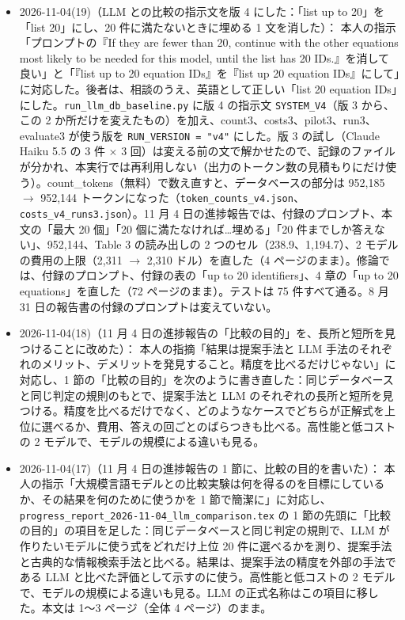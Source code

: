 \documentclass[11pt,a4paper]{jsarticle}
\begin{document}
\begin{itemize}[nosep]
  \item 2026-11-04(19)（LLM との比較の指示文を版 4 にした：「list up to 20」を「list 20」にし、20 件に満たないときに埋める 1 文を消した）：
    本人の指示「プロンプトの『If they are fewer than 20, continue with the other equations most likely to be needed for this model, until the list has 20 IDs.』を消して良い」と「『list up to 20 equation IDs』を『list up 20 equation IDs』にして」に対応した。後者は、相談のうえ、英語として正しい「list 20 equation IDs」にした。\texttt{run\_llm\_db\_baseline.py} に版 4 の指示文 \texttt{SYSTEM\_V4}（版 3 から、この 2 か所だけを変えたもの）を加え、count3、costs3、pilot3、run3、evaluate3 が使う版を \texttt{RUN\_VERSION = "v4"} にした。版 3 の試し（Claude Haiku 5.5 の 3 件 $\times$ 3 回）は変える前の文で解かせたので、記録のファイルが分かれ、本実行では再利用しない（出力のトークン数の見積もりにだけ使う）。count\_tokens（無料）で数え直すと、データベースの部分は 952,185 $\to$ 952,144 トークンになった（\texttt{token\_counts\_v4.json}、\texttt{costs\_v4\_runs3.json}）。11 月 4 日の進捗報告では、付録のプロンプト、本文の「最大 20 個」「20 個に満たなければ…埋める」「20 件までしか答えない」、952,144、Table 3 の読み出しの 2 つのセル（238.9、1,194.7）、2 モデルの費用の上限（2,311 $\to$ 2,310 ドル）を直した（4 ページのまま）。修論では、付録のプロンプト、付録の表の「up to 20 identifiers」、4 章の「up to 20 equations」を直した（72 ページのまま）。テストは 75 件すべて通る。8 月 31 日の報告書の付録のプロンプトは変えていない。
  \item 2026-11-04(18)（11 月 4 日の進捗報告の「比較の目的」を、長所と短所を見つけることに改めた）：
    本人の指摘「結果は提案手法と LLM 手法のそれぞれのメリット、デメリットを発見すること。精度を比べるだけじゃない」に対応し、1 節の「比較の目的」を次のように書き直した：同じデータベースと同じ判定の規則のもとで、提案手法と LLM のそれぞれの長所と短所を見つける。精度を比べるだけでなく、どのようなケースでどちらが正解式を上位に選べるか、費用、答えの回ごとのばらつきも比べる。高性能と低コストの 2 モデルで、モデルの規模による違いも見る。
  \item 2026-11-04(17)（11 月 4 日の進捗報告の 1 節に、比較の目的を書いた）：
    本人の指示「大規模言語モデルとの比較実験は何を得るのを目標にしているか、その結果を何のために使うかを 1 節で簡潔に」に対応し、\texttt{progress\_report\_2026-11-04\_llm\_comparison.tex} の 1 節の先頭に「比較の目的」の項目を足した：同じデータベースと同じ判定の規則で、LLM が作りたいモデルに使う式をどれだけ上位 20 件に選べるかを測り、提案手法と古典的な情報検索手法と比べる。結果は、提案手法の精度を外部の手法である LLM と比べた評価として示すのに使う。高性能と低コストの 2 モデルで、モデルの規模による違いも見る。LLM の正式名称はこの項目に移した。本文は 1〜3 ページ（全体 4 ページ）のまま。

\end{itemize}
\end{document}
